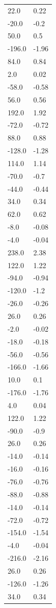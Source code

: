 \begin{longtable}{ll}
22.0 & 0.22 \\
-20.0 & -0.2 \\
50.0 & 0.5 \\
-196.0 & -1.96 \\
84.0 & 0.84 \\
2.0 & 0.02 \\
-58.0 & -0.58 \\
56.0 & 0.56 \\
192.0 & 1.92 \\
-72.0 & -0.72 \\
88.0 & 0.88 \\
-128.0 & -1.28 \\
114.0 & 1.14 \\
-70.0 & -0.7 \\
-44.0 & -0.44 \\
34.0 & 0.34 \\
62.0 & 0.62 \\
-8.0 & -0.08 \\
-4.0 & -0.04 \\
238.0 & 2.38 \\
122.0 & 1.22 \\
-94.0 & -0.94 \\
-120.0 & -1.2 \\
-26.0 & -0.26 \\
26.0 & 0.26 \\
-2.0 & -0.02 \\
-18.0 & -0.18 \\
-56.0 & -0.56 \\
-166.0 & -1.66 \\
10.0 & 0.1 \\
-176.0 & -1.76 \\
4.0 & 0.04 \\
122.0 & 1.22 \\
-90.0 & -0.9 \\
26.0 & 0.26 \\
-14.0 & -0.14 \\
-16.0 & -0.16 \\
-76.0 & -0.76 \\
-88.0 & -0.88 \\
-14.0 & -0.14 \\
-72.0 & -0.72 \\
-154.0 & -1.54 \\
-4.0 & -0.04 \\
-216.0 & -2.16 \\
26.0 & 0.26 \\
-126.0 & -1.26 \\
34.0 & 0.34 \\

\end{longtable}
